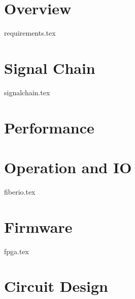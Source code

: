 \documentclass{book}
\begin{document}
\tableofcontents

\chapter{Overview}
{requirements.tex}

\chapter{Signal Chain}
{signalchain.tex}

\chapter{Performance}

\chapter{Operation and IO}
{fiberio.tex}

\chapter{Firmware}
{fpga.tex}

\chapter{Circuit Design}
\end{document}
